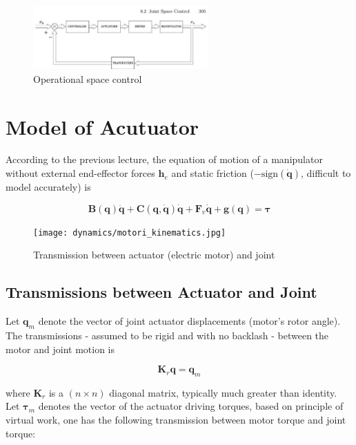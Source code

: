 \documentclass[10pt]{article}
\begin{document}
\begin{figure}[H]
    \centering
    \includegraphics[max width=0.6\textwidth]{control/operational_space_control.jpg}
    \caption{Operational space control}
    \label{fig.operational_space_control}
\end{figure}





\section{Model of Acutuator}
According to the previous lecture, the equation of motion of a manipulator without external end-effector forces $\boldsymbol{h}_{e}$ and  static friction ($-\text{sign}(\boldsymbol{\dot{q}})$,  difficult to model accurately) is

$$
\boldsymbol{B}(\boldsymbol{q}) \ddot{\boldsymbol{q}}+\boldsymbol{C}(\boldsymbol{q}, \dot{\boldsymbol{q}}) \dot{\boldsymbol{q}}+\boldsymbol{F}_{v} \dot{\boldsymbol{q}}+\boldsymbol{g}(\boldsymbol{q})=\boldsymbol{\tau}
$$




\begin{figure}[H]
    \centering
    \texttt{[image: dynamics/motori\_kinematics.jpg]}
    \caption{Transmission between actuator (electric motor) and joint}
    \label{fig:enter-label}
\end{figure}

\subsection{Transmissions between Actuator and Joint}
 Let $\boldsymbol{q}_{m}$ denote the vector of joint actuator displacements (motor's rotor angle). The transmissions - assumed to be rigid and with no backlash - between the motor and joint motion is 

\begin{equation}\label{equ.transmission_model}
    \boldsymbol{K}_{r} \boldsymbol{q}=\boldsymbol{q}_{m}
\end{equation}

where $\boldsymbol{K}_{r}$ is a $(n \times n)$ diagonal matrix, typically much greater than identity. Let $\boldsymbol{\tau}_{m}$ denotes the vector of the actuator driving torques, based on principle of virtual work, one has the following  transmission between motor torque and joint torque:
\end{document}
